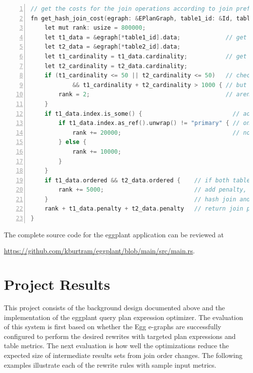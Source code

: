 \documentclass{article}
\begin{document}
\begin{lstlisting}[language=C++,
    frame=single, numbers=left, numbersep=5pt, numberstyle=\tiny\color{mygray},stringstyle=\ttfamily]
// get the costs for the join operations according to join preference rules
fn get_hash_join_cost(egraph: &EPlanGraph, table1_id: &Id, table2_id: &Id) -> usize {
    let mut rank: usize = 800000;
    let t1_data = &egraph[*table1_id].data;             // get the e-node data object
    let t2_data = &egraph[*table2_id].data;
    let t1_cardinality = t1_data.cardinality;           // get cardinalities from data
    let t2_cardinality = t2_data.cardinality;
    if (t1_cardinality <= 50 || t2_cardinality <= 50)   // check if either table is small 
            && t1_cardinality + t2_cardinality > 1000 { // but that both tables together 
        rank = 2;                                       // aren't small
    }
    if t1_data.index.is_some() {                          // add penalty for foreign key 
        if t1_data.index.as_ref().unwrap() != "primary" { // on left node to force that 
            rank += 20000;                                // node to move right
        } else {
            rank += 10000;
        }
    }
    if t1_data.ordered && t2_data.ordered {    // if both tables are ordered than
        rank += 5000;                          // add penalty, this disqualifies
    }                                          // hash join and prefers merge join
    rank + t1_data.penalty + t2_data.penalty   // return join penalty plus child penalties 
}
\end{lstlisting}

The complete source code for the eggplant application can be reviewed at 


\noindent \href{https://github.com/kburtram/eggplant/blob/main/src/main.rs}{https://github.com/kburtram/eggplant/blob/main/src/main.rs}.

\section*{Project Results}
This project consists of the background design documented above and the implementation of the eggplant 
query plan expression optimizer.  The evaluation of this system is first based on whether the Egg e-graphs
are successfully configured to perform the desired rewrites with targeted plan expressions and table metrics.
The next evaluation is how well the optimizations reduce the expected size of intermediate results sets
from join order changes.  The following examples illustrate each of the rewrite rules with sample input metrics.
\end{document}

